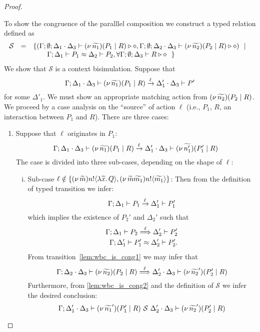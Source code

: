 \begin{proof}
\begin{enumerate}[I.]
	To show the congruence of the paralllel composition we construct a typed relation defined as 
	\[
	\begin{array}{rcl}
		\mathcal{S} &=&	\{
				(\Gamma; \emptyset; \Delta_1 \cdot \Delta_3 \vdash (\nu\, \widetilde{n_1})(P_1 \;|\; R) \triangleright \diamond,
				\Gamma; \emptyset; \Delta_2 \cdot \Delta_3 \vdash (\nu\, \widetilde{n_2})(P_2 \;|\; R)\triangleright \diamond)
				\ \ |\ \  \\
		& &		\qquad \Gamma; \Delta_1 \vdash P_1 \approx \Delta_2 \vdash P_2, \forall \Gamma; \emptyset; \Delta_3 \vdash R \triangleright \diamond~~\}\\
	\end{array}
	\]
	\noi We  show that $\mathcal{S}$ is a context bisimulation.
	Suppose that 
	$$
	\Gamma; \Delta_1 \cdot \Delta_3 \vdash (\nu\, \widetilde{n_1})(P_1 \;|\; R) \xrightarrow{\ell} \Delta_1' \cdot \Delta_3 \vdash P'
					$$
	for some $\Delta'_1$. We must show an appropriate matching action from $(\nu\, \widetilde{n_2})(P_2 \;|\; R)$.
	We proceed by a case analysis on the ``source'' of  action $\ell$ (i.e., $P_1$, $R$, an interaction between $P_1$ and $R$).
    There are three cases:
    
	\begin{enumerate}[1.]

		\item Suppose that $\ell$ originates in $P_1$:
				\[
					\Gamma; \Delta_1 \cdot \Delta_3 \vdash (\nu\, \widetilde{n_1})(P_1 \;|\; R) \xrightarrow{\ell} \Delta_1' \cdot \Delta_3 \vdash (\nu\, \widetilde{n_1'})(P_1' \;|\; R)
				\]
				\noi The case is divided into three sub-cases, depending on the shape of $\ell$:

				\begin{enumerate}[i.]
					\item Sub-case	$\ell \notin \{(\nu\, \widetilde{m}) n ! \langle \lambda \widetilde{x}.\,Q \rangle, (\nu\, \widetilde{m}\widetilde{m_1}) n ! \langle \widetilde{m_1} \rangle\}$: Then from the definition of typed transition we infer:
							\[
								\Gamma; \Delta_1 \vdash P_1 \xrightarrow{\ell} \Delta_1' \vdash P_1'
							\]
							\noi which implies the existence of $P_2'$ and $\Delta_2'$ such that
							\begin{eqnarray}
								\Gamma; \Delta_1 \vdash P_2 \stackrel{\ell}{\Longrightarrow} \Delta_2' \vdash P_2'
								\label{lem:wbc_is_cong1}\\
								\Gamma; \Delta_1' \vdash P_1' \approx \Delta_2' \vdash P_2'.
								\label{lem:wbc_is_cong2}
							\end{eqnarray}
							\noi From transition~\eqref{lem:wbc_is_cong1} we may infer that 
							\[
								\Gamma; \Delta_2 \cdot \Delta_3 \vdash (\nu\, \widetilde{n_2})(P_2 \;|\; R) \stackrel{\ell}{\Longrightarrow} \Delta_2' \cdot \Delta_3 \vdash (\nu\, \widetilde{n_2}')(P_2' \;|\; R)
							\]
							\noi Furthermore, from \eqref{lem:wbc_is_cong2} and the definition of $\mathcal{S}$ we infer the desired conclusion:
							\[
								\Gamma; \Delta_1' \cdot \Delta_3 \vdash (\nu\, \widetilde{n_1}')(P_1' \;|\; R) \ \mathcal{S}\  \Delta_2' \cdot \Delta_3 \vdash (\nu\, \widetilde{n_2}')(P_2' \;|\; R)
							\]
							

\end{enumerate}
\end{enumerate}
\end{enumerate}
\end{proof}
